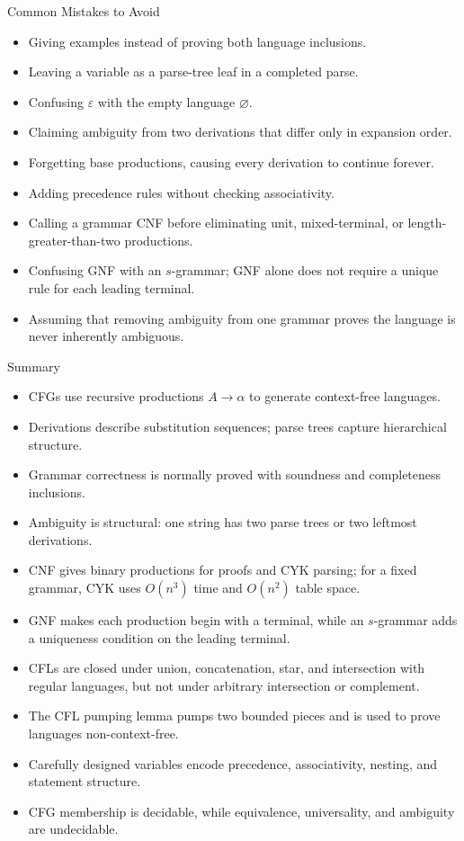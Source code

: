 \documentclass[10pt]{beamer}
\begin{document}
\begin{frame}{Common Mistakes to Avoid}
  \begin{itemize}
    \item Giving examples instead of proving both language inclusions.
    \item Leaving a variable as a parse-tree leaf in a completed parse.
    \item Confusing $\varepsilon$ with the empty language $\varnothing$.
    \item Claiming ambiguity from two derivations that differ only in expansion order.
    \item Forgetting base productions, causing every derivation to continue forever.
    \item Adding precedence rules without checking associativity.
    \item Calling a grammar CNF before eliminating unit, mixed-terminal, or
      length-greater-than-two productions.
    \item Confusing GNF with an $s$-grammar; GNF alone does not require a
      unique rule for each leading terminal.
    \item Assuming that removing ambiguity from one grammar proves the language is never inherently ambiguous.
  \end{itemize}
\end{frame}

\begin{frame}{Summary}
  \begin{itemize}
    \item CFGs use recursive productions $A\to\alpha$ to generate context-free languages.
    \item Derivations describe substitution sequences; parse trees capture hierarchical structure.
    \item Grammar correctness is normally proved with soundness and completeness inclusions.
    \item Ambiguity is structural: one string has two parse trees or two leftmost derivations.
    \item CNF gives binary productions for proofs and CYK parsing; for a fixed
      grammar, CYK uses $O(n^3)$ time and $O(n^2)$ table space.
    \item GNF makes each production begin with a terminal, while an
      $s$-grammar adds a uniqueness condition on the leading terminal.
    \item CFLs are closed under union, concatenation, star, and intersection with regular languages,
      but not under arbitrary intersection or complement.
    \item The CFL pumping lemma pumps two bounded pieces and is used to prove languages non-context-free.
    \item Carefully designed variables encode precedence, associativity, nesting, and statement structure.
    \item CFG membership is decidable, while equivalence, universality, and ambiguity are undecidable.
  \end{itemize}
\end{frame}
\end{document}
